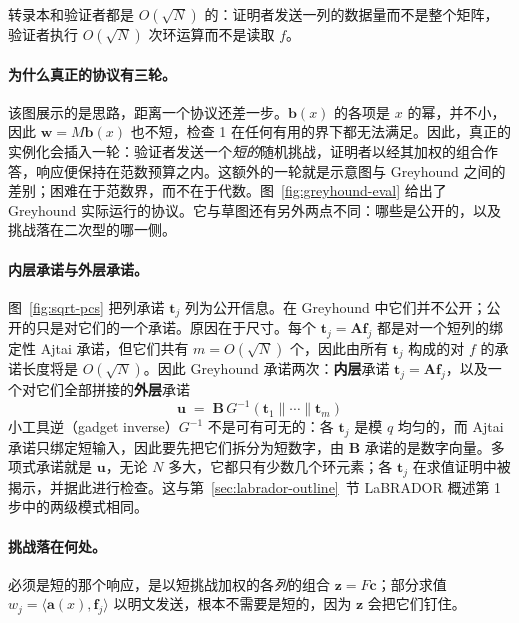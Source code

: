 转录本和验证者都是 $O(\sqrt{N})$ 的：证明者发送一列的数据量而不是整个矩阵，验证者执行 $O(\sqrt{N})$ 次环运算而不是读取 $f$。

\paragraph{为什么真正的协议有三轮。}
该图展示的是思路，距离一个协议还差一步。$\mathbf{b}(x)$ 的各项是 $x$ 的幂，并不小，因此 $\mathbf{w}=M\mathbf{b}(x)$ 也不短，检查 1 在任何有用的界下都无法满足。因此，真正的实例化会插入一轮：验证者发送一个\emph{短的}随机挑战，证明者以经其加权的组合作答，响应便保持在范数预算之内。这额外的一轮就是示意图与 Greyhound 之间的差别；困难在于范数界，而不在于代数。图~\ref{fig:greyhound-eval} 给出了 Greyhound 实际运行的协议。它与草图还有另外两点不同：哪些是公开的，以及挑战落在二次型的哪一侧。

\paragraph{内层承诺与外层承诺。}
图~\ref{fig:sqrt-pcs} 把列承诺 $\mathbf{t}_j$ 列为公开信息。在 Greyhound 中它们并不公开；公开的只是对它们的一个承诺。原因在于尺寸。每个 $\mathbf{t}_j=\mathbf{A}\mathbf{f}_j$ 都是对一个短列的绑定性 Ajtai 承诺，但它们共有 $m=O(\sqrt{N})$ 个，因此由所有 $\mathbf{t}_j$ 构成的对 $f$ 的承诺长度将是 $O(\sqrt{N})$。因此 Greyhound 承诺两次：\textbf{内层}承诺 $\mathbf{t}_j=\mathbf{A}\mathbf{f}_j$，以及一个对它们全部拼接的\textbf{外层}承诺
\[
  \mathbf{u}\;=\;\mathbf{B}\,G^{-1}(\mathbf{t}_1\|\cdots\|\mathbf{t}_m)
\]
小工具逆（gadget inverse）$G^{-1}$ 不是可有可无的：各 $\mathbf{t}_j$ 是模 $q$ 均匀的，而 Ajtai 承诺只绑定短输入，因此要先把它们拆分为短数字，由 $\mathbf{B}$ 承诺的是数字向量。多项式承诺就是 $\mathbf{u}$，无论 $N$ 多大，它都只有少数几个环元素；各 $\mathbf{t}_j$ 在求值证明中被揭示，并据此进行检查。这与第~\ref{sec:labrador-outline}~节 LaBRADOR 概述第 1 步中的两级模式相同。

\paragraph{挑战落在何处。}
必须是短的那个响应，是以短挑战加权的各\emph{列}的组合 $\mathbf{z}=F\mathbf{c}$；部分求值 $w_j=\langle\mathbf{a}(x),\mathbf{f}_j\rangle$ 以明文发送，根本不需要是短的，因为 $\mathbf{z}$ 会把它们钉住。

